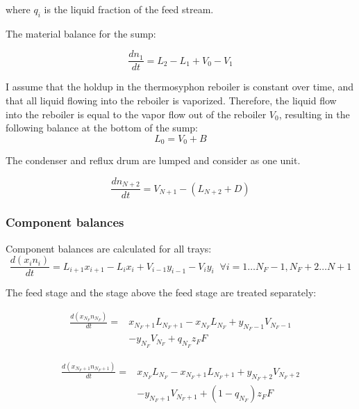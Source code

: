 where $q_i$ is the liquid fraction of the feed stream.

The material balance for the sump:

\begin{equation}
    \frac{dn_1}{dt} = L_2 - L_1 + V_0 - V_1
\end{equation}

I assume that the holdup in the thermosyphon reboiler is constant over time, and that all liquid flowing into the reboiler is vaporized. Therefore, the liquid flow into the reboiler is equal to the vapor flow out of the reboiler $V_0$, resulting in the following balance at the bottom of the sump:
\begin{equation}
    L_0 = V_0 + B
\end{equation}

The condenser and reflux drum are lumped and consider as one unit.

\begin{equation}
    \frac{dn_{N+2}}{dt} = V_{N+1}-(L_{N+2} + D)    
\end{equation}


\subsubsection{Component balances}

Component balances are calculated for all trays:
\begin{equation}
   \frac{d(x_{i} n_{i})}{dt}= L_{i+1} x_{i+1} - L_i x_{i} + V_{i-1} y_{i-1} -V_i y_i  \;\; \forall i=1 \dots N_F-1, N_F+2 \dots N+1
\end{equation}

The  feed stage and the stage above the feed stage are treated separately:

\begin{equation}
\begin{split}
 \frac{d(x_{N_F} n_{N_F})}{dt} =  &  x_{N_F+1}L_{N_F+1}  - x_{N_F}L_{N_F} +  y_{N_F-1}V_{N_F-1} \\ & -y_{N_F}V_{N_F} + q_{N_F}z_FF   
\end{split}
\end{equation}

\begin{equation}
\begin{split}
    \frac{d(x_{N_F+1} n_{N_F+1})}{dt} =  & x_{N_F}L_{N_F} - x_{N_F+1}L_{N_F+1} +  y_{N_F+2}V_{N_F+2}   \\ & -y_{N_F+1}V_{N_F+1}  + (1-q_{N_F})z_FF 
\end{split}
\end{equation}

